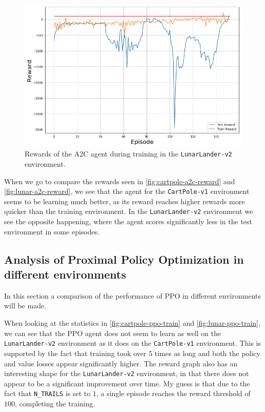 \documentclass{article}
\begin{document}
   \begin{figure}[htbp]
    \centering
    \includegraphics[width=\textwidth]{LunarLander-A2C-reward}
    \caption{Rewards of the A2C agent during training in the
             \texttt{LunarLander-v2} environment.}
    \label{fig:lunar-a2c-reward}
   \end{figure}

   When we go to compare the rewards seen in \autoref{fig:cartpole-a2c-reward}
   and \autoref{fig:lunar-a2c-reward}, we see that the agent for the
   \texttt{CartPole-v1} environment seems to be learning much better, as its
   reward reaches higher rewards more quicker than the training environment.
   In the \texttt{LunarLander-v2} environment we see the opposite happening,
   where the agent scores significantly less in the test environment in some
   episodes.

  \subsection[Analysis of PPO in different environments]{Analysis of Proximal
    Policy Optimization in different environments}
   In this section a comparison of the performance of PPO in different
   environments will be made.

   When looking at the statistics in \autoref{fig:cartpole-ppo-train} and
   \autoref{fig:lunar-ppo-train}, we can see that the PPO agent does not seem to
   learn as well on the \texttt{LunarLander-v2} environment as it does on the
   \texttt{CartPole-v1} environment.  This is supported by the fact that
   training took over 5 times as long and both the policy and value losses
   appear significantly higher.  The reward graph also has an interesting shape
   for the \texttt{LunarLander-v2} environment, in that there does not appear to
   be a significant improvement over time.  My guess is that due to the fact 
   that \texttt{N\_TRAILS} is set to $1$, a single episode reaches the reward 
   threshold of $100$, completing the training.
\end{document}
